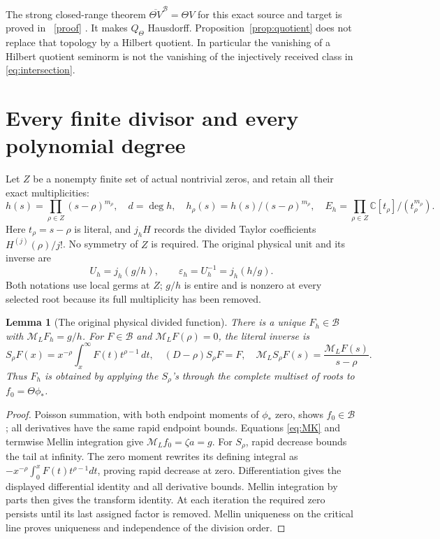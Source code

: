\documentclass[11pt]{article}
\newtheorem{lemma}[theorem]{Lemma}
\newcommand{\C}{\mathbb C}\newcommand{\R}{\mathbb R}
\newcommand{\B}{\mathscr B}\newcommand{\HH}{\mathcal H}
\newcommand{\ML}{\mathcal M_{\!L}}\newcommand{\MR}{\mathcal M_{\!R}}
\begin{document}
The strong closed-range theorem $\overline{\Theta V}^{\B}=\Theta V$
for this exact source and target is proved in \cite{ClosedTheta}%
~\href{https://github.com/KokunoYumeto/zeta-function-research-reader/blob/5992ad50c0f2a06921f1fcaded7b4e38097c0739/workbenches/splitzero-tandem/continuations/20260920-original-kernel-mixed-determinants/providers/ORIGINAL_THETA_CLOSED_RANGE.tex\#L1}{[proof]}%
{}.
It makes $Q_\Theta$ Hausdorff. Proposition~\ref{prop:quotient}
does not replace that topology by a Hilbert quotient. In particular
the vanishing of a Hilbert quotient seminorm is not the vanishing
of the injectively received class in \eqref{eq:intersection}.

\section{Every finite divisor and every polynomial degree}

Let $Z$ be a nonempty finite set of actual nontrivial zeros, and
retain all their exact multiplicities:
\begin{equation}\label{eq:h}
 h(s)=\prod_{\rho\in Z}(s-\rho)^{m_\rho},\quad d=\deg h,
 \quad h_\rho(s)=h(s)/(s-\rho)^{m_\rho},\quad
 E_h=\prod_{\rho\in Z}\C[t_\rho]/(t_\rho^{m_\rho}).
\end{equation}
Here $t_\rho=s-\rho$ is literal, and $j_hH$ records the divided
Taylor coefficients $H^{(j)}(\rho)/j!$. No symmetry of $Z$ is
required. The original physical unit and its inverse are
\begin{equation}\label{eq:unit}
 U_h=j_h(g/h),\qquad \varepsilon_h=U_h^{-1}=j_h(h/g).
\end{equation}
Both notations use local germs at $Z$; $g/h$ is entire and is
nonzero at every selected root because its full multiplicity
has been removed.

\begin{lemma}[The original physical divided function]\label{lem:Fh}
There is a unique $F_h\in\B$ with $\ML F_h=g/h$.
For $F\in\B$ and $\ML F(\rho)=0$, the literal inverse is
\[
 S_\rho F(x)=x^{-\rho}\int_x^\infty F(t)t^{\rho-1}\,dt,
 \quad(D-\rho)S_\rho F=F,\quad
 \ML S_\rho F(s)=\frac{\ML F(s)}{s-\rho}.
\]
Thus $F_h$ is obtained by applying the $S_\rho$'s through
the complete multiset of roots to $f_0=\Theta\phi_*$.
\end{lemma}
\begin{proof}
Poisson summation, with both endpoint moments of $\phi_*$ zero,
shows $f_0\in\B$; all derivatives have the same rapid endpoint
bounds. Equations \eqref{eq:MK} and termwise Mellin integration
give $\ML f_0=\zeta a=g$. For $S_\rho$, rapid decrease bounds
the tail at infinity. The zero moment rewrites its defining
integral as $-x^{-\rho}\int_0^xF(t)t^{\rho-1}dt$, proving rapid
decrease at zero. Differentiation gives the displayed differential
identity and all derivative bounds. Mellin integration by parts
then gives the transform identity. At each iteration the required
zero persists until its last assigned factor is removed.
Mellin uniqueness on the critical line proves uniqueness and
independence of the division order.
\end{proof}
\end{document}
